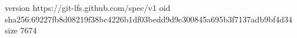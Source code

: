 version https://git-lfs.github.com/spec/v1
oid sha256:69227fb8d08219f38bc4226b1df03bedd9d9e300845a695b3f7137adb9bf4d34
size 7674
